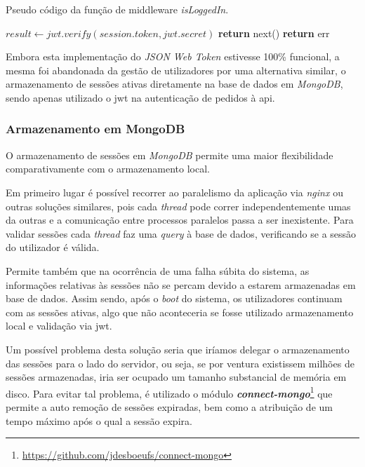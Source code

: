\begin{algorithm}
    \caption{Pseudo código da função  de middleware \emph{isLoggedIn}.}
    \begin{algorithmic}[1]
        \State $result \gets jwt.verify(session.token, jwt.secret)$
                \State \textbf{return} next()
            \Else
                \State \textbf{return} err
            \EndIf
        \EndIf
    \EndFunction
    \end{algorithmic}
\end{algorithm}

Embora esta implementação do \emph{JSON Web Token} estivesse 100\% funcional, a mesma foi abandonada da gestão de utilizadores por uma alternativa similar, o armazenamento de sessões ativas diretamente na base de dados em \emph{MongoDB}, sendo apenas utilizado o \gls{jwt} na autenticação de pedidos à \gls{api}.

\cleardoublepage
\subsubsection{Armazenamento em MongoDB} \label{armazenamentoMongo}

O armazenamento de sessões em \emph{MongoDB} permite uma maior flexibilidade comparativamente com o armazenamento local.

Em primeiro lugar é possível recorrer ao paralelismo da aplicação via \emph{nginx} ou outras soluções similares, pois cada \emph{thread} pode correr independentemente umas da outras e a comunicação entre processos paralelos passa a ser inexistente. Para validar sessões cada \emph{thread} faz uma \emph{query} à base de dados, verificando se a sessão do utilizador é válida.

Permite também que na ocorrência de uma falha súbita do sistema, as informações relativas às sessões não se percam devido a estarem armazenadas em base de dados. Assim sendo, após o \emph{boot} do sistema, os utilizadores continuam com as sessões ativas, algo que não aconteceria se fosse utilizado armazenamento local e validação via \gls{jwt}.

Um possível problema desta solução seria que iríamos delegar o armazenamento das sessões para o lado do servidor, ou seja, se por ventura existissem milhões de sessões armazenadas, iria ser ocupado um tamanho substancial de memória em disco. Para evitar tal problema, é utilizado o módulo \emph{\textbf{connect-mongo}}\footnote{\url{https://github.com/jdesboeufs/connect-mongo}} que permite a auto remoção de sessões expiradas, bem como a atribuição de um tempo máximo após o qual a sessão expira.

